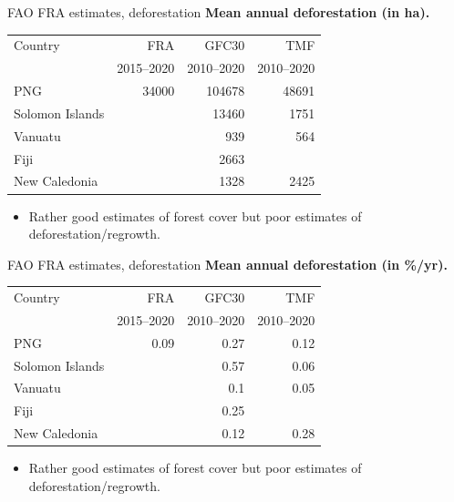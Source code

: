 \documentclass[10pt,table,dvipsnames,compress]{beamer}
\begin{document}
\begin{frame}[label={sec:org5e040cc}]{FAO FRA estimates, deforestation}
\textbf{Mean annual deforestation (in ha).}

\begin{center}
\footnotesize
\begin{tabular}{lrrr}
Country & FRA & GFC30 & TMF\\[0pt]
 & 2015--2020 & 2010--2020 & 2010--2020\\[0pt]
\hline
PNG & 34000 & 104678 & 48691\\[0pt]
Solomon Islands &  & 13460 & 1751\\[0pt]
Vanuatu &  & 939 & 564\\[0pt]
Fiji &  & 2663 & \\[0pt]
New Caledonia &  & 1328 & 2425\\[0pt]
\end{tabular}
\end{center}

\begin{itemize}
\item Rather good estimates of forest cover but poor estimates of deforestation/regrowth.
\end{itemize}
\end{frame}

\begin{frame}[label={sec:org952a15d}]{FAO FRA estimates, deforestation}
\textbf{Mean annual deforestation (in \%/yr).}

\begin{center}
\footnotesize
\begin{tabular}{lrrr}
Country & FRA & GFC30 & TMF\\[0pt]
 & 2015--2020 & 2010--2020 & 2010--2020\\[0pt]
\hline
PNG & 0.09 & 0.27 & 0.12\\[0pt]
Solomon Islands &  & 0.57 & 0.06\\[0pt]
Vanuatu &  & 0.1 & 0.05\\[0pt]
Fiji &  & 0.25 & \\[0pt]
New Caledonia &  & 0.12 & 0.28\\[0pt]
\end{tabular}
\end{center}

\begin{itemize}
\item Rather good estimates of forest cover but poor estimates of deforestation/regrowth.
\end{itemize}
\end{frame}
\end{document}
